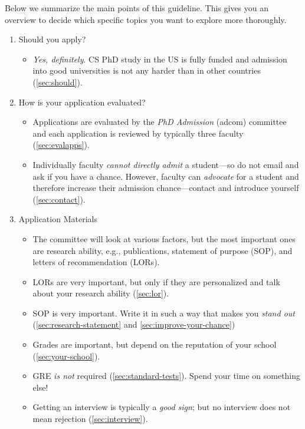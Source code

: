 \documentclass[oneside,11pt]{book}
\begin{document}
Below we summarize the main points of this guideline. This gives you an overview to decide which specific topics you want to explore more thoroughly.


\begin{enumerate}
  \item Should you apply?
        \begin{itemize}
          \item \emph{Yes, definitely}.  CS PhD study in the US is fully funded and admission into good universities is not any harder than in other countries (\autoref{sec:should}).
        \end{itemize}
  \item How is your application evaluated?
        \begin{itemize}
          \item Applications are evaluated by the \emph{PhD Admission} (adcom) committee and each application is reviewed by typically three faculty (\autoref{sec:evalapps}).
          \item Individually faculty \emph{cannot directly admit} a student---so do not email and ask if you have a chance. However, faculty can \emph{advocate} for a student and therefore increase their admission chance---contact and introduce yourself (\autoref{sec:contact}).
         \end{itemize}
  \item Application Materials
        \begin{itemize}
          \item The committee will look at various factors, but the most important ones are research ability, e.g., publications, statement of purpose (SOP), and  letters of recommendation (LORs).
          \item LORs are very important, but only if they are personalized and talk about your research ability (\autoref{sec:lor}).
          \item SOP is very important. Write it in such a way that makes you \emph{stand out} (\autoref{sec:research-statement} and \autoref{sec:improve-your-chance})
          \item Grades are important, but depend on the reputation of your school (\autoref{sec:your-school}).
          \item GRE \emph{is not} required (\autoref{sec:standard-tests}). Spend your time on something else!
          \item Getting an interview is typically a \emph{good sign}; but no interview does not mean rejection (\autoref{sec:interview}).
           

\end{itemize}
\end{enumerate}
\end{document}
